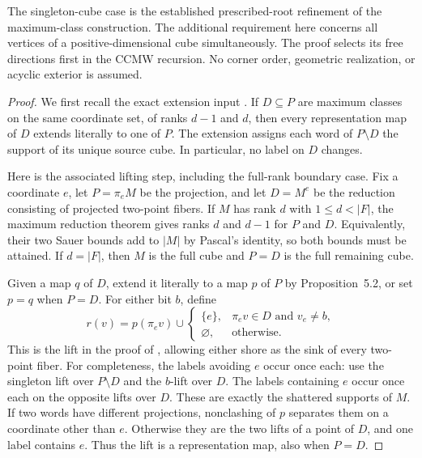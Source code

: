The singleton-cube case is the established prescribed-root refinement of
the maximum-class construction. The additional requirement here concerns
all vertices of a positive-dimensional cube simultaneously. The proof
selects its free directions first in the CCMW recursion. No corner
order, geometric realization, or acyclic exterior is assumed.

\begin{proof}
We first recall the exact extension input
\cite[Proposition~5.2]{ChalopiChepoiMoran22}. If $D\subseteq P$ are
maximum classes on the same coordinate set, of ranks $d-1$ and $d$,
then every representation map of $D$ extends literally to one of $P$.
The extension assigns each word of $P\setminus D$ the support of its
unique source cube. In particular, no label on $D$ changes.

Here is the associated lifting step, including the full-rank boundary
case. Fix a coordinate $e$, let $P=\pi_e M$ be the projection, and let
$D=M^e$ be the reduction consisting of projected two-point fibers.
If $M$ has rank $d$ with $1\le d<|F|$, the maximum reduction theorem
gives ranks $d$ and $d-1$ for $P$ and $D$. Equivalently, their two
Sauer bounds add to $|M|$ by Pascal's identity, so both bounds must be
attained. If $d=|F|$, then $M$ is the full cube and $P=D$ is the full
remaining cube.

Given a map $q$ of $D$, extend it literally to a map $p$ of $P$ by
Proposition~5.2, or set $p=q$ when $P=D$. For either bit $b$, define
\begin{equation}
 r(v)=p(\pi_e v)\cup
 \begin{cases}
  \{e\},&\pi_e v\in D\text{ and }v_e\ne b,\\
  \varnothing,&\text{otherwise}.
 \end{cases}
 \label{eq:maximum-cube-inward-lift}
\end{equation}
This is the lift in the proof of
\cite[Theorem~5.1]{ChalopiChepoiMoran22}, allowing either shore as the
sink of every two-point fiber. For completeness, the labels avoiding
$e$ occur once each: use the singleton lift over $P\setminus D$ and
the $b$-lift over $D$. The labels containing $e$ occur once each on
the opposite lifts over $D$. These are exactly the shattered supports
of $M$. If two words have different projections, nonclashing of $p$
separates them on a coordinate other than $e$. Otherwise they are the
two lifts of a point of $D$, and one label contains $e$. Thus the lift
is a representation map, also when $P=D$.


\end{proof}
